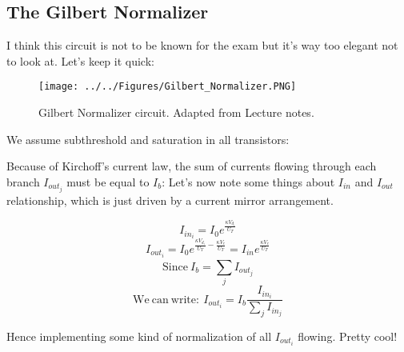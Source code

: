\subsection{The Gilbert Normalizer}

I think this circuit is not to be known for the exam but it's way too elegant not to look at. Let's keep it quick:

\begin{figure}[H]
    \centering
    \texttt{[image: ../../Figures/Gilbert\_Normalizer.PNG]}
    \caption{Gilbert Normalizer circuit. Adapted from Lecture notes.}
    \label{fig:Gilbert_Normalizer}
\end{figure}

We assume subthreshold and saturation in all transistors: 

Because of Kirchoff's current law, the sum of currents flowing through each branch $I_{out_j}$ must be equal to $I_b$: 
Let's now note some things about $I_{in}$ and $I_{out}$ relationship, which is just driven by a current mirror arrangement. 

\begin{equation}
    I_{in_i} = I_0 e^{\frac{\kappa V_{d_i}}{U_T}}
\end{equation}
\begin{equation}
    I_{out_i} = I_0 e^{\frac{\kappa V_{d_i}}{U_T} - \frac{\kappa V_c}{U_T}} = I_{in}e^{\frac{\kappa V_c}{U_T}}
\end{equation}
\begin{equation}
    \mathrm{Since \ } I_b = \sum_{j}^{}I_{out_j}
\end{equation}
\begin{equation}
    \mathrm{We \ can \ write: }\ I_{out_i} = I_b \frac{I_{in_i}}{\sum_{j}^{}I_{in_j}}
\end{equation}

Hence implementing some kind of normalization of all $I_{out_i}$ flowing. Pretty cool!